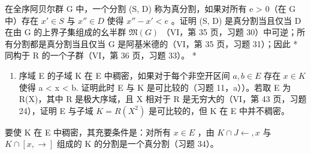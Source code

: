 在全序阿贝尔群 G 中，一个分割 (S, D) 称为真分割，如果对所有 e \textgreater{} 0（在 G 中）存在 \(x' \in S\) 与 \(x'' \in D\) 使得 \(x'' - x' < e\) 。证明 (S, D) 是真分割当且仅当 D 在由 G 的上界子集组成的幺半群 \(\mathfrak{M}(G)\) （VI，第 35 页，习题 30）中可逆；所有分割都是真分割当且仅当 G 是阿基米德的（VI，第 35 页，习题 31）；因此 * 同构于 R 的一个子群（VI，第 36 页，习题 33）。 *

\begin{enumerate}
\def\labelenumi{\arabic{enumi})}
\setcounter{enumi}{34}
\tightlist
\item
  序域 E 的子域 K 在 E 中稠密，如果对于每个非空开区间 \(a, b \in E\) 存在 \(x \in K\) 使得 a \textless{} x \textless{} b. 证明此时 E 与 K 是可比较的（习题 11，a））。若取 E 为 R(X)，其中 R 是极大序域，且 X 相对于 R 是无穷大的（VI，第 43 页，习题 24），证明 E 与子域 \(K = R(X^{2})\) 是可比较的，但 K 在 E 中并不稠密。
\end{enumerate}

要使 K 在 E 中稠密，其充要条件是：对所有 \(x \in E\) ，由 \(K \cap J \leftarrow, x\) 与 \(K \cap [x, \rightarrow]\) 组成的 K 的分割是一个真分割（习题 34）。

